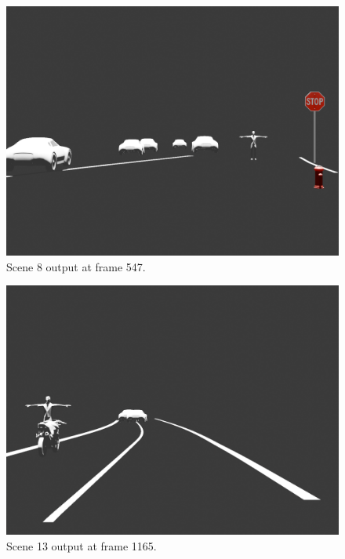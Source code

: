 \begin{figure}[H]
  \centering
  \includegraphics[width=0.95\linewidth]{images/results/scene8_frame547.png}
  \caption{Scene 8 output at frame 547.}
\end{figure}

\begin{figure}[H]
  \centering
  \includegraphics[width=0.95\linewidth]{images/results/scene13_frame1165.png}
  \caption{Scene 13 output at frame 1165.}
\end{figure}